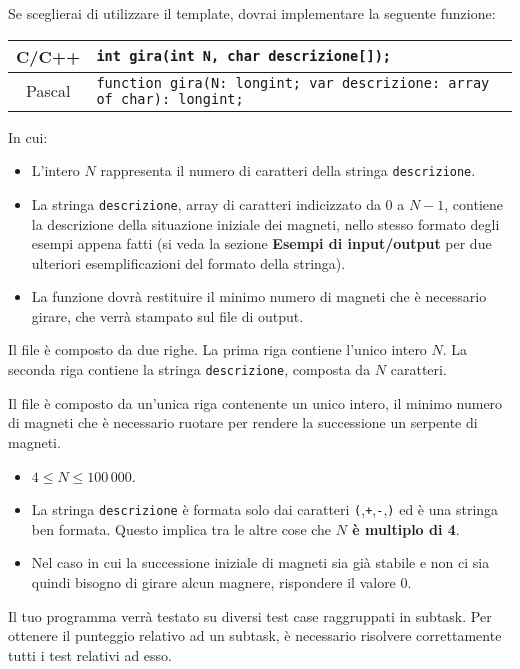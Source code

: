 Se sceglierai di utilizzare il template, dovrai implementare la seguente funzione:
\begin{center}\begin{tabularx}{\textwidth}{|c|X|}
\hline
C/C++  & \verb|int gira(int N, char descrizione[]);|\\
\hline
Pascal & \verb|function gira(N: longint; var descrizione: array of char): longint;|\\
\hline
\end{tabularx}\end{center}
In cui:
\begin{itemize}[nolistsep]
  \item L'intero $N$ rappresenta il numero di caratteri della stringa \texttt{descrizione}.
  \item La stringa \texttt{descrizione}, array di caratteri indicizzato da $0$ a $N-1$, contiene la descrizione della situazione iniziale dei magneti, nello stesso formato degli esempi appena fatti (si veda la sezione \textbf{Esempi di input/output} per due ulteriori esemplificazioni del formato della stringa).
  \item La funzione dovrà restituire il minimo numero di magneti che è necessario girare, che verrà stampato sul file di output.
\end{itemize}

\InputFile
Il file  è composto da due righe. La prima riga contiene l'unico intero $N$. La seconda riga contiene la stringa \texttt{descrizione}, composta da $N$ caratteri.

\OutputFile
Il file \outputfile{} è composto da un'unica riga contenente un unico intero, il minimo numero di magneti che è necessario ruotare per rendere la successione un serpente di magneti.

\newpage
\Constraints
\begin{itemize}[nolistsep, itemsep=2mm]
	\item $4 \le N \le 100\,000$.
	\item La stringa \texttt{descrizione} è formata solo dai caratteri \texttt{(},\texttt{+},\texttt{-},\texttt{)} ed è una stringa ben formata. Questo implica tra le altre cose che \textbf{$N$ è multiplo di 4}.
	\item Nel caso in cui la successione iniziale di magneti sia già stabile e non ci sia quindi bisogno di girare alcun magnere, rispondere il valore 0.
\end{itemize}

\Scoring
Il tuo programma verrà testato su diversi test case raggruppati in subtask.
Per ottenere il punteggio relativo ad un subtask, è necessario risolvere
correttamente tutti i test relativi ad esso.

